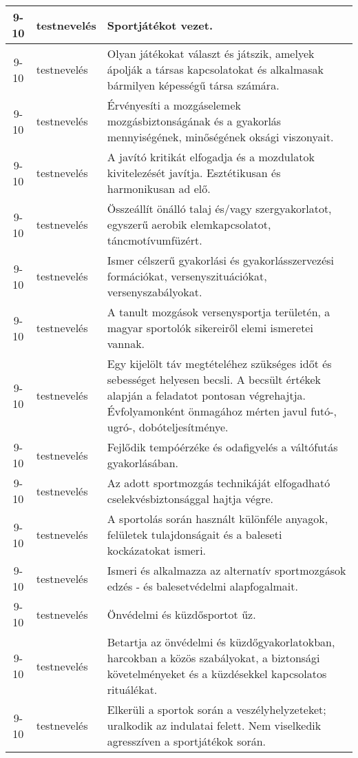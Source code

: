 \begin{small}
\begin{longtable}{c | p{2cm} |  p{11cm} }
              9-10 & testnevelés & Sportjátékot vezet. \\ \hline
              9-10 & testnevelés & Olyan játékokat választ és játszik, amelyek ápolják a társas kapcsolatokat és alkalmasak bármilyen képességű társa számára. \\ \hline
              9-10 & testnevelés & Érvényesíti a mozgáselemek mozgásbiztonságának és a gyakorlás mennyiségének, minőségének oksági viszonyait. \\ \hline
              9-10 & testnevelés & A javító kritikát elfogadja és a mozdulatok kivitelezését javítja. Esztétikusan és harmonikusan ad elő. \\ \hline
              9-10 & testnevelés & Összeállít önálló talaj és/vagy szergyakorlatot, egyszerű aerobik elemkapcsolatot, táncmotívumfüzért. \\ \hline
              9-10 & testnevelés & Ismer célszerű gyakorlási és gyakorlásszervezési formációkat, versenyszituációkat, versenyszabályokat. \\ \hline
              9-10 & testnevelés & A tanult mozgások versenysportja területén, a magyar sportolók sikereiről elemi ismeretei vannak. \\ \hline
              9-10 & testnevelés & Egy kijelölt táv megtételéhez szükséges időt és sebességet helyesen becsli. A becsült értékek alapján a feladatot pontosan végrehajtja. Évfolyamonként önmagához mérten javul futó-, ugró-, dobóteljesítménye. \\ \hline
              9-10 & testnevelés & Fejlődik tempóérzéke és odafigyelés a váltófutás gyakorlásában. \\ \hline
              9-10 & testnevelés & Az adott sportmozgás technikáját elfogadható cselekvésbiztonsággal hajtja végre. \\ \hline
              9-10 & testnevelés & A sportolás során használt különféle anyagok, felületek tulajdonságait és a baleseti kockázatokat ismeri. \\ \hline
              9-10 & testnevelés & Ismeri és alkalmazza az alternatív sportmozgások edzés - és balesetvédelmi alapfogalmait. \\ \hline
              9-10 & testnevelés & Önvédelmi és küzdősportot űz. \\ \hline
              9-10 & testnevelés & Betartja az önvédelmi és küzdőgyakorlatokban, harcokban a közös szabályokat, a biztonsági követelményeket és a küzdésekkel kapcsolatos rituálékat. \\ \hline
              9-10 & testnevelés & Elkerüli a sportok során a veszélyhelyzeteket; uralkodik az indulatai felett. Nem viselkedik agresszíven a sportjátékok során. \\ \hline

\end{longtable}
\end{small}
